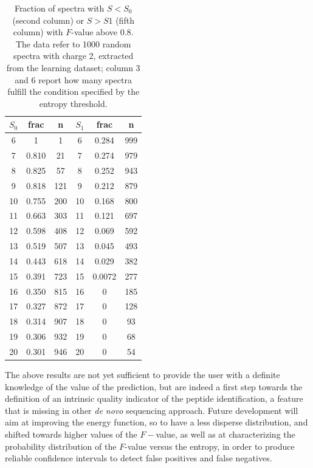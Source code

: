 \begin{table}
\begin{center}
\begin{tabular}{ccc|ccc}
\hline \hline
$S_0$ & frac & n &$S_1$ & frac& n \\
\hline
6  & 1     & 1   & 6  & 0.284  &999 \\
7  & 0.810 & 21  & 7  & 0.274  &979 \\
8  & 0.825 & 57  & 8  & 0.252  &943 \\
9  & 0.818 & 121 & 9  & 0.212  &879 \\
10 & 0.755 & 200 & 10 & 0.168  &800 \\
11 & 0.663 & 303 & 11 & 0.121  &697 \\
12 & 0.598 & 408 & 12 & 0.069  &592 \\
13 & 0.519 & 507 & 13 & 0.045  &493 \\
14 & 0.443 & 618 & 14 & 0.029  &382 \\
15 & 0.391 & 723 & 15 & 0.0072 &277   \\
16 & 0.350 & 815 & 16 & 0      &185  \\
17 & 0.327 & 872 & 17 & 0      &128  \\
18 & 0.314 & 907 & 18 & 0      &93  \\
19 & 0.306 & 932 & 19 & 0      &68  \\
20 & 0.301 & 946 & 20 & 0      &54  \\
\hline \hline
\end{tabular}
\end{center}
\caption{\label{tab:corr}
Fraction of spectra with $S<S_0$ (second column) or $S>S1$ (fifth column) with $F$-value above 0.8. 
The data refer to 1000 random spectra with charge 2, extracted from the learning dataset; column 3 and 6 report how many spectra fulfill the condition specified by the entropy threshold. 
}
\end{table}

The above results are not yet sufficient to provide the user with a definite knowledge of the value of the prediction, but are indeed a first step towards the definition of an intrinsic quality indicator of the peptide identification, a feature that is missing in other 
 \emph{de novo} sequencing approach. Future development will aim at improving the energy function, so to have a less disperse distribution, and shifted towards higher values of the $F-$value, as well as at characterizing the  probability distribution of the $F$-value versus the entropy, in order to produce reliable confidence intervals to detect false positives and false negatives.






